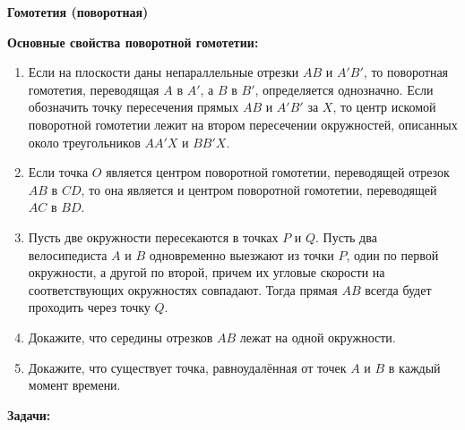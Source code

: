\documentclass{article}
\begin{document}
\large

\begin{center}
	\textbf{Гомотетия (поворотная)}
\end{center}

\textbf{Основные свойства поворотной гомотетии:}

\begin{enumerate}[label*=\protect\fbox{\arabic{enumi}}]
	
\item Если на плоскости даны непараллельные отрезки $AB$ и $A'B'$, то поворотная гомотетия, переводящая $A$ в $A'$, а $B$ в $B'$, определяется однозначно. Если обозначить точку пересечения прямых $AB$ и $A'B'$ за $X$, то центр искомой поворотной гомотетии лежит на втором пересечении окружностей, описанных около треугольников $AA'X$ и $BB'X$.

\item Если точка $O$ является центром поворотной гомотетии, переводящей отрезок $AB$ в $CD$, то она является и центром поворотной гомотетии, переводящей $AC$ в $BD$.

\item Пусть две окружности пересекаются в точках $P$ и $Q$. Пусть два велосипедиста $A$ и $B$ одновременно выезжают из точки $P$, один по первой окружности, а другой по второй, причем их угловые скорости на соответствующих окружностях совпадают. Тогда прямая $AB$ всегда будет проходить через точку $Q$.

\item Докажите, что середины отрезков $AB$ лежат на одной окружности.

\item Докажите, что существует точка, равноудалённая от точек $A$ и $B$ в каждый момент времени.

\end{enumerate}

\textbf{Задачи:}
\end{document}

